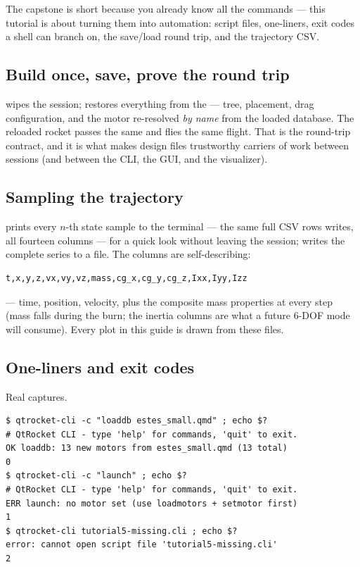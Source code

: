 The capstone is short because you already know all the commands --- this
tutorial is about turning them into automation: script files, one-liners, exit
codes a shell can branch on, the save/load round trip, and the trajectory CSV.

\subsection*{Build once, save, prove the round trip}





 wipes the session;  restores everything
from the  --- tree, placement, drag configuration, and the motor
re-resolved \emph{by name} from the loaded database. The reloaded rocket
passes the same  and flies the same flight. That is the
round-trip contract, and it is what makes design files trustworthy carriers of
work between sessions (and between the CLI, the GUI, and the visualizer).

\subsection*{Sampling the trajectory}



 prints every $n$-th state sample to the terminal --- the same
full CSV rows  writes, all fourteen columns --- for a quick look
without leaving the session;  writes the complete series to a
file. The columns are self-describing:

\begin{verbatim}
t,x,y,z,vx,vy,vz,mass,cg_x,cg_y,cg_z,Ixx,Iyy,Izz
\end{verbatim}

--- time, position, velocity, plus the composite mass properties at every
step (mass falls during the burn; the inertia columns are what a future 6-DOF
mode will consume). Every plot in this guide is drawn from these files.

\subsection*{One-liners and exit codes}

Real captures.

\begin{verbatim}
$ qtrocket-cli -c "loaddb estes_small.qmd" ; echo $?
# QtRocket CLI - type 'help' for commands, 'quit' to exit.
OK loaddb: 13 new motors from estes_small.qmd (13 total)
0
$ qtrocket-cli -c "launch" ; echo $?
# QtRocket CLI - type 'help' for commands, 'quit' to exit.
ERR launch: no motor set (use loadmotors + setmotor first)
1
$ qtrocket-cli tutorial5-missing.cli ; echo $?
error: cannot open script file 'tutorial5-missing.cli'
2
\end{verbatim}

